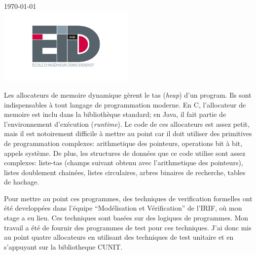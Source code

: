 \documentclass[11pt]{article}
\begin{document}
\begin{titlepage}
{\large \today}\\[0.1cm] %


\includegraphics[width=0.5\textwidth]{figures/eidd.jpeg}\\[0cm] %
 

\vfill %

\end{titlepage}

Les allocateurs de memoire dynamique gèrent le tas (\emph{heap}) d'un program.
Ils sont indispensables à tout langage de programmation moderne. En C, l'allocateur de memoire est inclu dans la bibliothèque standard; en Java, il fait partie de l'environnement d'exécution (\emph{runtime}).
Le code de ces allocateurs est assez petit, mais il est notoirement difficile à mettre au point car il doit utiliser des primitives de programmation complexes: arithmetique des pointeurs, operations bit à bit, appels système. De plus, les structures de données que ce code utilise sont assez complexes: liste-tas (champs suivant obtenu avec l'arithmetique des pointeurs), listes doublement chainées, listes circulaires, arbres binaires de recherche, tables de hachage. 

Pour mettre au point ces programmes, des techniques de verification formelles ont été developpées dans l'équipe ``Modélisation et Vérification'' de l'IRIF, où mon stage a eu lieu. Ces techniques sont basées sur des logiques de programmes. Mon travail a été de fournir des programmes de test pour ces techniques.
J'ai donc mis au point quatre allocateurs en utilisant des techniques de test unitaire et en s'appuyant sur la  bibliotheque CUNIT.
\clearpage

\tableofcontents







\end{document}
